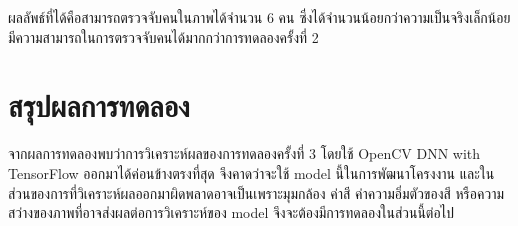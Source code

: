 ผลลัพธ์ที่ได้คือสามารถตรวจจับคนในภาพได้จำนวน 6 คน ซึ่งได้จำนวนน้อยกว่าความเป็นจริงเล็กน้อย มีความสามารถในการตรวจจับคนได้มากกว่าการทดลองครั้งที่ 2

\section{สรุปผลการทดลอง}
\hspace{10mm} จากผลการทดลองพบว่าการวิเคราะห์ผลของการทดลองครั้งที่ 3 โดยใช้ OpenCV DNN with TensorFlow ออกมาได้ค่อนข้างตรงที่สุด จึงคาดว่าจะใช้ model นี้ในการพัฒนาโครงงาน
และในส่วนของการที่วิเคราะห์ผลออกมาผิดพลาดอาจเป็นเพราะมุมกล้อง ค่าสี ค่าความอิ่มตัวของสี หรือความสว่างของภาพที่อาจส่งผลต่อการวิเคราะห์ของ model จึงจะต้องมีการทดลองในส่วนนี้ต่อไป

